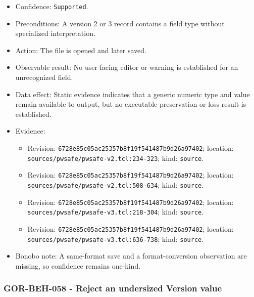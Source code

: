 \documentclass[
  letterpaper,
]{article}
\newcommand{\passthrough}[1]{#1}
\providecommand{\tightlist}{%
  \setlength{\itemsep}{0pt}\setlength{\parskip}{0pt}}
\begin{document}
\begin{itemize}
\tightlist
\item
  Confidence: \passthrough{\lstinline!Supported!}.
\item
  Preconditions: A version 2 or 3 record contains a field type without specialized interpretation.
\item
  Action: The file is opened and later saved.
\item
  Observable result: No user-facing editor or warning is established for an unrecognized field.
\item
  Data effect: Static evidence indicates that a generic numeric type and value remain available to output, but no
  executable preservation or loss result is established.
\item
  Evidence:

  \begin{itemize}
  \tightlist
  \item
    Revision: \nolinkurl{6728e85c05ac25357b8f19f541487b9d26a97402}; location:
    \nolinkurl{sources/pwsafe/pwsafe-v2.tcl:234-323}; kind: \passthrough{\lstinline!source!}.
  \item
    Revision: \nolinkurl{6728e85c05ac25357b8f19f541487b9d26a97402}; location:
    \nolinkurl{sources/pwsafe/pwsafe-v2.tcl:508-634}; kind: \passthrough{\lstinline!source!}.
  \item
    Revision: \nolinkurl{6728e85c05ac25357b8f19f541487b9d26a97402}; location:
    \nolinkurl{sources/pwsafe/pwsafe-v3.tcl:218-304}; kind: \passthrough{\lstinline!source!}.
  \item
    Revision: \nolinkurl{6728e85c05ac25357b8f19f541487b9d26a97402}; location:
    \nolinkurl{sources/pwsafe/pwsafe-v3.tcl:636-738}; kind: \passthrough{\lstinline!source!}.
  \end{itemize}
\item
  Bonobo note: A same-format save and a format-conversion observation are missing, so confidence remains one-kind.
\end{itemize}

\subsubsection{GOR-BEH-058 - Reject an undersized Version value}\label{gor-beh-058---reject-an-undersized-version-value}
\end{document}
